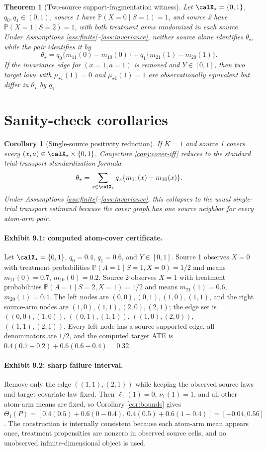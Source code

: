 \documentclass[11pt]{article}
\renewcommand{\Pr}{\mathbb{P}}
\theoremstyle{definition}
\theoremstyle{plain}
\newtheorem{theorem}{Theorem}
\newtheorem{corollary}{Corollary}
\theoremstyle{remark}
\begin{document}
\begin{theorem}[Two-source support-fragmentation witness]\label{thm:witness}
Let $\calX_\star=\{0,1\}$, $q_0,q_1\in(0,1)$, source 1 have $\Pr(X=0\mid S=1)=1$, and source 2 have $\Pr(X=1\mid S=2)=1$, with both treatment arms randomized in each source. Under Assumptions \ref{ass:finite}--\ref{ass:invariance}, neither source alone identifies $\theta_\star$, while the pair identifies it by
\[
\theta_\star=q_0\{m_{11}(0)-m_{10}(0)\}+q_1\{m_{21}(1)-m_{20}(1)\}.
\]
If the invariance edge for $(x=1,a=1)$ is removed and $Y\in[0,1]$, then two target laws with $\mu_{\star 1}(1)=0$ and $\mu_{\star 1}(1)=1$ are observationally equivalent but differ in $\theta_\star$ by $q_1$.
\end{theorem}

\section{Sanity-check corollaries}
\begin{corollary}[Single-source positivity reduction]\label{cor:single-source}
If $K=1$ and source 1 covers every $(x,a)\in\calX_\star\times\{0,1\}$, Conjecture \ref{conj:cover-iff} reduces to the standard trial-transport standardization formula
\[
\theta_\star=\sum_{x\in\calX_\star}q_x\{m_{11}(x)-m_{10}(x)\}.
\]
Under Assumptions \ref{ass:finite}--\ref{ass:invariance}, this collapses to the usual single-trial transport estimand because the cover graph has one source neighbor for every atom-arm pair.
\end{corollary}

\paragraph{Exhibit 9.1: computed atom-cover certificate.}
Let $\calX_\star=\{0,1\}$, $q_0=0.4$, $q_1=0.6$, and $Y\in[0,1]$. Source 1 observes $X=0$ with treatment probabilities $\Pr(A=1\mid S=1,X=0)=1/2$ and means $m_{11}(0)=0.7$, $m_{10}(0)=0.2$. Source 2 observes $X=1$ with treatment probabilities $\Pr(A=1\mid S=2,X=1)=1/2$ and means $m_{21}(1)=0.6$, $m_{20}(1)=0.4$. The left nodes are $(0,0),(0,1),(1,0),(1,1)$, and the right source-arm nodes are $(1,0),(1,1),(2,0),(2,1)$; the edge set is $((0,0),(1,0))$, $((0,1),(1,1))$, $((1,0),(2,0))$, $((1,1),(2,1))$. Every left node has a source-supported edge, all denominators are $1/2$, and the computed target ATE is $0.4(0.7-0.2)+0.6(0.6-0.4)=0.32$.

\paragraph{Exhibit 9.2: sharp failure interval.}
Remove only the edge $((1,1),(2,1))$ while keeping the observed source laws and target covariate law fixed. Then $\ell_1(1)=0$, $\nu_1(1)=1$, and all other atom-arm means are fixed, so Corollary \ref{cor:bounds} gives $\Theta_I(P)=[0.4(0.5)+0.6(0-0.4),\,0.4(0.5)+0.6(1-0.4)]=[-0.04,0.56]$. The construction is internally consistent because each atom-arm mean appears once, treatment propensities are nonzero in observed source cells, and no unobserved infinite-dimensional object is used.
\end{document}
